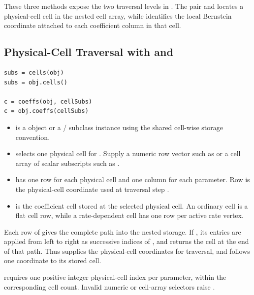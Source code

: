 These three methods expose the two traversal levels in . The pair  and  locates a physical-cell cell in the nested cell array, while  identifies the local Bernstein coordinate attached to each coefficient column in that cell.

\subsection{Physical-Cell Traversal with \texorpdfstring{}{cells} and \texorpdfstring{}{coeffs}}

\syntaxhead
\begin{lstlisting}[style=dpsyntax]
subs = cells(obj)
subs = obj.cells()

c = coeffs(obj, cellSubs)
c = obj.coeffs(cellSubs)
\end{lstlisting}

\arghead
\begin{itemize}[leftmargin=*]
    \item {} is a  object or a / subclass instance using the shared cell-wise storage convention.
    \item {} selects one physical cell for .  Supply a numeric row vector such as \code{[2 1]} or a cell array of scalar subscripts such as .
    \item {} has one row for each physical cell and one column for each parameter. Row  is the physical-cell coordinate used at traversal step .
    \item {} is the coefficient cell stored at the selected physical cell. An ordinary cell is a flat cell row, while a rate-dependent cell has one row per active rate vertex.
\end{itemize}

Each row of  gives the complete path into the nested storage. If , its entries are applied from left to right as successive indices of , and  returns the cell at the end of that path. Thus  supplies the physical-cell coordinates for traversal, and  follows one coordinate to its stored cell.

\remarkshead
{} requires one positive integer physical-cell index per parameter, within the corresponding cell count.  Invalid numeric or cell-array selectors raise .

